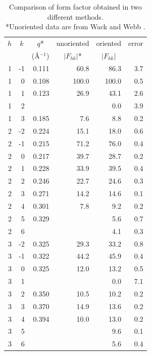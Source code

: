 \begin{table}[htbp]
  \centering
  \begin{tabular}{rrrrrr}
    \hline
    \multicolumn{1}{c}{$h$} & \multicolumn{1}{c}{$k$} & \multicolumn{1}{c}{$q$*} & \multicolumn{1}{c}{unoriented} & \multicolumn{1}{c}{oriented} & \multicolumn{1}{c}{error} \\
     & & \multicolumn{1}{c}{(\AA$^{-1}$)} & \multicolumn{1}{c}{$|F_{hk}|$*} & \multicolumn{1}{c}{$|F_{hk}|$} \\
    \hline
    1 & -1 & {\color{red}0.111}   & 60.8  & 86.3  & 3.7 \\
    1 &  0 & {\color{red}0.108}   & 100.0 & 100.0 & 0.5 \\
    1 &  1 & 0.123                & 26.9  & 43.1  & 2.6 \\
    1 &  2 &                      &       & 0.0   & 3.9 \\
    1 &	 3 & 0.185                & 7.6   & 8.8   & 0.2 \\
    2 &	-2 & 0.224                & 15.1  & 18.0  & 0.6 \\
    2 &	-1 & {\color{blue}0.215}  & 71.2  & 76.0  & 0.4 \\
    2 &  0 & {\color{blue}0.217}  & 39.7  & 28.7  & 0.2 \\
    2 &	 1 & 0.228                & 33.9  & 39.5  & 0.4 \\
    2 &  2 & 0.246                & 22.7  & 24.6  & 0.3 \\
    2 &	 3 & 0.271                & 14.2  & 14.6  & 0.1 \\
    2 &  4 & 0.301                & 7.8   & 9.2   & 0.2 \\
    2 &  5 & 0.329                &       & 5.6   & 0.7 \\
    2 &  6 &                      &       & 4.1   & 0.3 \\
	  3 &	-2 & {\color{green}0.325} & 29.3  & 33.2  & 0.8 \\
    3 & -1 & 0.322                & 44.2  & 45.9  & 0.4 \\
    3 &  0 & {\color{green}0.325} & 12.0  & 13.2  & 0.5 \\
    3 &  1 &                      &       & 0.0   & 7.1 \\
    3 &  2 & 0.350                & 10.5  & 10.2  & 0.2 \\
    3 &  3 & 0.370                & 14.9  & 13.6  & 0.2 \\
    3 &  4 & 0.394                & 10.0  & 13.0  & 0.2 \\
    3 &  5 &                      &       & 9.6   & 0.1 \\
    3 &  6 &                      &       & 5.6   & 0.4 \\
    \hline
  \end{tabular}
  \caption{Comparison of form factor obtained in two different methods.\\
  *Unoriented data are from Wack and Webb \cite{ref:Wack89}.}
  \label{tb:cmu_vs_wack}
\end{table}


